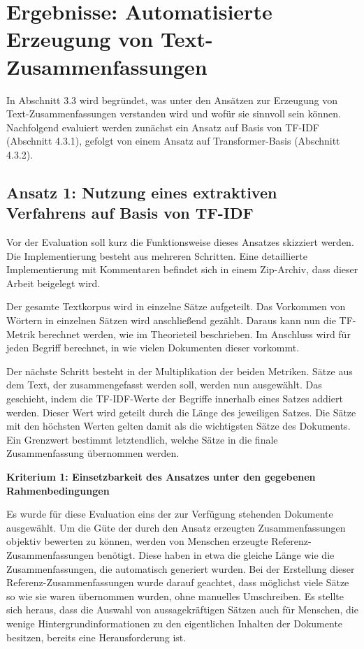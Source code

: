 \section{Ergebnisse: Automatisierte Erzeugung von Text-Zusammenfassungen}

In Abschnitt 3.3 wird begründet, was unter den Ansätzen zur Erzeugung von Text-Zusammenfassungen verstanden wird und wofür sie sinnvoll sein können. Nachfolgend evaluiert werden zunächst ein Ansatz auf Basis von TF-IDF (Abschnitt 4.3.1), gefolgt von einem Ansatz auf Transformer-Basis (Abschnitt 4.3.2). 

\subsection{Ansatz 1: Nutzung eines extraktiven Verfahrens auf Basis von TF-IDF}

Vor der Evaluation soll kurz die Funktionsweise dieses Ansatzes skizziert werden. Die Implementierung besteht aus mehreren Schritten. Eine detaillierte Implementierung mit Kommentaren befindet sich in einem Zip-Archiv, dass dieser Arbeit beigelegt wird.

Der gesamte Textkorpus wird in einzelne Sätze aufgeteilt. Das Vorkommen von Wörtern in einzelnen Sätzen wird anschließend gezählt. Daraus kann nun die TF-Metrik berechnet werden, wie im Theorieteil beschrieben. Im Anschluss wird für jeden Begriff berechnet, in wie vielen Dokumenten dieser vorkommt.

Der nächste Schritt besteht in der Multiplikation der beiden Metriken. Sätze aus dem Text, der zusammengefasst werden soll, werden nun ausgewählt. Das geschieht, indem die TF-IDF-Werte der Begriffe innerhalb eines Satzes addiert werden. Dieser Wert wird geteilt durch die Länge des jeweiligen Satzes. Die Sätze mit den höchsten Werten gelten damit als die wichtigsten Sätze des Dokuments. Ein Grenzwert bestimmt letztendlich, welche Sätze in die finale Zusammenfassung übernommen werden.

{\bf Kriterium 1: Einsetzbarkeit des Ansatzes unter den gegebenen Rahmenbedingungen}

Es wurde für diese Evaluation eins der zur Verfügung stehenden Dokumente ausgewählt.
Um die Güte der durch den Ansatz erzeugten Zusammenfassungen objektiv bewerten zu können, werden von Menschen erzeugte Referenz-Zusammenfassungen benötigt. Diese haben in etwa die gleiche Länge wie die Zusammenfassungen, die automatisch generiert wurden. Bei der Erstellung dieser Referenz-Zusammenfassungen wurde darauf geachtet, dass möglichst viele Sätze so wie sie waren übernommen wurden, ohne manuelles Umschreiben. Es stellte sich heraus, dass die Auswahl von aussagekräftigen Sätzen auch für Menschen, die wenige Hintergrundinformationen zu den eigentlichen Inhalten der Dokumente besitzen, bereits eine Herausforderung ist.
 

